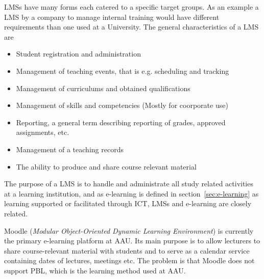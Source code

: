 LMSs have many forms each catered to a specific target groups. As an example a LMS by a company to manage internal training would have different requirements than one used at a University. The general characteristics of a LMS are~\citep{Kerschenbaum}
\begin{itemize}
	\item Student registration and administration
	\item Management of teaching events, that is e.g. scheduling and tracking
	\item Management of curriculums and obtained qualifications
	\item Management of skills and competencies (Mostly for coorporate use)
	\item Reporting, a general term describing reporting of grades, approved assignments, etc.
	\item Management of	a teaching records
	\item The ability to produce and share course relevant material

\end{itemize}

The purpose of a LMS is to handle and administrate all study related activities at a learning institution, and as e-learning is defined in section~\ref{sec:e-learning} as learning supported or facilitated through ICT, LMSs and e-learning are closely related.

Moodle (\emph{Modular Object-Oriented Dynamic Learning Environment}) \citep{moodle} is currently the primary e-learning platform at AAU. Its main purpose is to allow lecturers to share course-relevant material with students and to serve as a calendar service containing dates of lectures, meetings etc. The problem is that Moodle does not support PBL, which is the learning method used at AAU.

